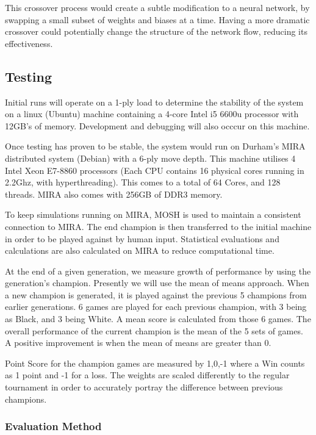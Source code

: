 \documentclass[12pt,a4paper]{article}
\begin{document}
            This crossover process would create a subtle modification to a neural network, by swapping a small subset of weights and biases at a time. Having a more dramatic crossover could potentially change the structure of the network flow, reducing its effectiveness.
            

    \subsection{Testing}
        Initial runs will operate on a 1-ply load to determine the stability of the system on a linux (Ubuntu) machine containing a 4-core Intel i5 6600u processor with 12GB's of memory. Development and debugging will also occcur on this machine. 
        
        Once testing has proven to be stable, the system would run on Durham's MIRA distributed system (Debian) with a 6-ply move depth. This machine utilises 4 Intel Xeon E7-8860 processors (Each CPU contains 16 physical cores running in 2.2Ghz, with hyperthreading). This comes to a total of 64 Cores, and 128 threads. MIRA also comes with 256GB of DDR3 memory. 
        
        To keep simulations running on MIRA, MOSH is used to maintain a consistent connection to MIRA. The end champion is then transferred to the initial machine in order to be played against by human input. Statistical evaluations and calculations are also calculated on MIRA to reduce computational time.

        At the end of a given generation, we measure growth of performance by using the generation's champion. Presently we will use the mean of means approach. When a new champion is generated, it is played against the previous 5 champions from earlier generations. 6 games are played for each previous champion, with 3 being as Black, and 3 being White. A mean score is calculated from those 6 games. The overall performance of the current champion is the mean of the 5 sets of games. A positive improvement is when the mean of means are greater than 0. 

        Point Score for the champion games are measured by {1,0,-1} where a Win counts as 1 point and -1 for a loss. The weights are scaled differently to the regular tournament in order to accurately portray the difference between previous champions.
    
        \subsubsection*{Evaluation Method}
    
\end{document}
